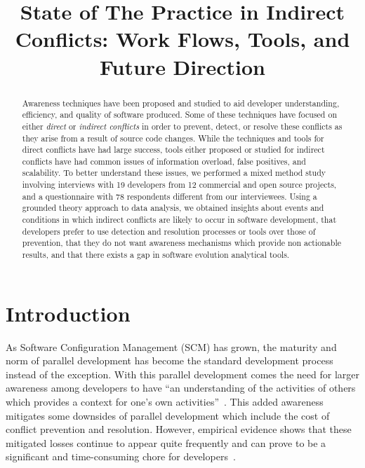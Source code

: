 \documentclass[conference]{IEEEtran}
\begin{document}
\title{State of The Practice in Indirect Conflicts: Work Flows, Tools, and Future Direction}

\author{
}

\maketitle

\begin{abstract}

Awareness techniques have been proposed and studied to aid developer
understanding, efficiency, and quality of software produced. Some of these techniques have focused
on either \textit{direct} or
\textit{indirect conflicts} in order to prevent, detect, or resolve these conflicts as they arise
from a result of source code changes. While the techniques and tools for direct conflicts have had
large success, tools either proposed or studied for indirect conflicts have had common issues of
information overload, false positives, and scalability. To better understand these issues,
we performed a mixed method study involving interviews with 19 developers from 12 commercial and open
source projects, and a questionnaire with 78 respondents different from our interviewees. Using a grounded theory approach to data analysis,
we obtained insights about events and conditions in which indirect conflicts are likely to occur in
software development, that developers prefer to use detection and resolution processes or tools
over those of prevention, that they do not want awareness mechanisms which provide non actionable results,
and that there exists a gap in software evolution analytical tools.

\end{abstract}

\section{Introduction}
\label{sec:intro}

As Software Configuration Management (SCM) has grown, the maturity and norm of parallel
development has become the standard development process instead of the exception. With this parallel development
comes the need for larger awareness among developers to have ``an understanding of the activities of others
which provides a context for one's own activities''~\cite{Dourish:1992:ACS}. This added awareness
mitigates some downsides of parallel development which include the cost of conflict prevention and resolution. However,
empirical evidence shows that these mitigated losses continue to appear quite frequently and can prove to be a significant
and time-consuming chore for developers~\cite{Perry:2001:PCL}.
\end{document}
